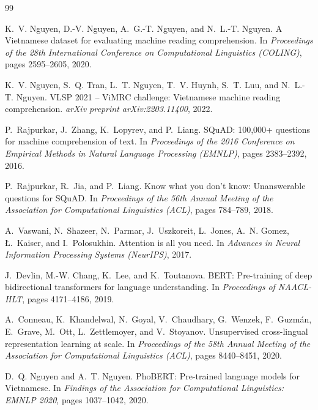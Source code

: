 \bigskip
{}
{}
{\footnotesize
\begin{thebibliography}{99}\setlength{\itemsep}{1pt}\setlength{\parskip}{0pt}

K.~V. Nguyen, D.-V. Nguyen, A.~G.-T. Nguyen, and N.~L.-T. Nguyen.
\newblock A Vietnamese dataset for evaluating machine reading comprehension.
\newblock In \emph{Proceedings of the 28th International Conference on Computational Linguistics (COLING)}, pages 2595--2605, 2020.

K.~V. Nguyen, S.~Q. Tran, L.~T. Nguyen, T.~V. Huynh, S.~T. Luu, and N.~L.-T. Nguyen.
\newblock VLSP 2021 -- ViMRC challenge: Vietnamese machine reading comprehension.
\newblock \emph{arXiv preprint arXiv:2203.11400}, 2022.

P.~Rajpurkar, J.~Zhang, K.~Lopyrev, and P.~Liang.
\newblock SQuAD: 100,000+ questions for machine comprehension of text.
\newblock In \emph{Proceedings of the 2016 Conference on Empirical Methods in Natural Language Processing (EMNLP)}, pages 2383--2392, 2016.

P.~Rajpurkar, R.~Jia, and P.~Liang.
\newblock Know what you don't know: Unanswerable questions for SQuAD.
\newblock In \emph{Proceedings of the 56th Annual Meeting of the Association for Computational Linguistics (ACL)}, pages 784--789, 2018.

A.~Vaswani, N.~Shazeer, N.~Parmar, J.~Uszkoreit, L.~Jones, A.~N. Gomez, Ł.~Kaiser, and I.~Polosukhin.
\newblock Attention is all you need.
\newblock In \emph{Advances in Neural Information Processing Systems (NeurIPS)}, 2017.

J.~Devlin, M.-W. Chang, K.~Lee, and K.~Toutanova.
\newblock BERT: Pre-training of deep bidirectional transformers for language understanding.
\newblock In \emph{Proceedings of NAACL-HLT}, pages 4171--4186, 2019.

A.~Conneau, K.~Khandelwal, N.~Goyal, V.~Chaudhary, G.~Wenzek, F.~Guzmán, E.~Grave, M.~Ott, L.~Zettlemoyer, and V.~Stoyanov.
\newblock Unsupervised cross-lingual representation learning at scale.
\newblock In \emph{Proceedings of the 58th Annual Meeting of the Association for Computational Linguistics (ACL)}, pages 8440--8451, 2020.

D.~Q. Nguyen and A.~T. Nguyen.
\newblock PhoBERT: Pre-trained language models for Vietnamese.
\newblock In \emph{Findings of the Association for Computational Linguistics: EMNLP 2020}, pages 1037--1042, 2020.


\end{thebibliography}}
